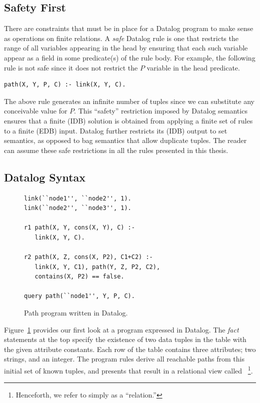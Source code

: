 \subsection{Safety First}
\label{ch:p2:sec:safety}

There are constraints that must be in place for a Datalog program to make sense
as operations on finite relations.  A {\em safe} Datalog rule is one that
restricts the range of all variables appearing in the head by ensuring that
each such variable appear as a field in some predicate(s) of the rule body.
For example, the following rule is not safe since it does not restrict the $P$
variable in the  head predicate.

\begin{lstlisting}[frame=none]
path(X, Y, P, C) :- link(X, Y, C).
\end{lstlisting}
The above rule generates an infinite number of  tuples since we can
substitute any conceivable value for $P$.  This ``safety'' restriction imposed
by Datalog semantics ensures that a finite (IDB) solution is obtained from
applying a finite set of rules to a finite (EDB) input.  Datalog further
restricts its (IDB) output to set semantics, as opposed to bag semantics that
allow duplicate tuples.  The reader can assume these safe restrictions in all
the rules presented in this thesis.

\subsection{Datalog Syntax}

\begin{figure}
\ssp
\begin{lstlisting}
link(``node1'', ``node2'', 1).
link(``node2'', ``node3'', 1).

r1 path(X, Y, cons(X, Y), C) :- 
   link(X, Y, C). 

r2 path(X, Z, cons(X, P2), C1+C2) :- 
   link(X, Y, C1), path(Y, Z, P2, C2),
   contains(X, P2) == false.

query path(``node1'', Y, P, C).
\end{lstlisting}
\caption{\label{ch:p2:fig:datalogPath}Path program written in Datalog.}
\end{figure}

Figure~\ref{ch:p2:fig:datalogPath} provides our first look at a program
expressed in Datalog.  The {\em fact} statements at the top specify the
existence of two data tuples in the  table with the given attribute
constants.  Each row of the  table contains three attributes; two
strings, and an integer.  The program rules derive all reachable paths from
this initial set of known  tuples, and presents that result in a
relational view called ~\footnote{Henceforth, we refer to simply as a
``relation.''}.

